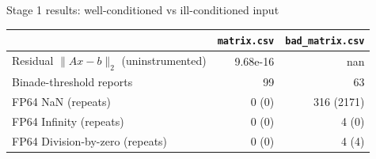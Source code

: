 \documentclass[aspectratio=169,10pt,xcolor=table]{beamer}
\begin{document}
\begin{frame}{Stage 1 results: well-conditioned vs ill-conditioned input}
\centering\small
\begin{tabular}{lrr}
 & \texttt{matrix.csv} & \texttt{bad\_matrix.csv}\\
\midrule
Residual $\|Ax-b\|_2$ (uninstrumented) & 9.68e-16 & nan\\
Binade-threshold reports & 99 & 63\\
FP64 NaN (repeats) & 0 (0) & 316 (2171)\\
FP64 Infinity (repeats) & 0 (0) & 4 (0)\\
FP64 Division-by-zero (repeats) & 0 (0) & 4 (4)\\
\bottomrule
\end{tabular}

\vspace{6mm}
\hfill
{}
\end{frame}
\end{document}
